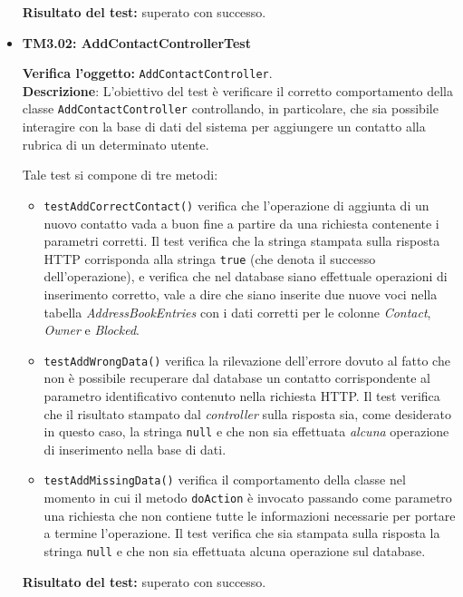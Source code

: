 \begin{itemize}
\begin{itemize}
\end{itemize}
\textbf{Risultato del test:} superato con successo.



\item[\passed] \textbf{TM3.02: AddContactControllerTest}

\textbf{Verifica l'oggetto:} \texttt{AddContactController}.\\
\textbf{Descrizione}: L'obiettivo del test è verificare il corretto comportamento della classe \texttt{AddContactController} controllando, in particolare, che sia possibile interagire con la base di dati del sistema per aggiungere un contatto alla rubrica di un determinato utente.

Tale test si compone di tre metodi:
\begin{itemize}
\item \texttt{testAddCorrectContact()} verifica che l'operazione di aggiunta di un nuovo contatto vada a buon fine a partire da una richiesta contenente i parametri corretti. Il test verifica che la stringa stampata sulla risposta HTTP corrisponda alla stringa \texttt{true} (che denota il successo dell'operazione), e verifica che nel database siano effettuale operazioni di inserimento corretto, vale a dire che siano inserite due nuove voci nella tabella \textit{AddressBookEntries} con i dati corretti per le colonne \textit{Contact}, \textit{Owner} e \textit{Blocked}.

\item \texttt{testAddWrongData()} verifica la rilevazione dell'errore dovuto al fatto che non è possibile recuperare dal database un contatto corrispondente al parametro identificativo contenuto nella richiesta HTTP. Il test verifica che il risultato stampato dal \textit{controller} sulla risposta sia, come desiderato in questo caso, la stringa \texttt{null} e che non sia effettuata \textit{alcuna} operazione di inserimento nella base di dati.

\item \texttt{testAddMissingData()} verifica il comportamento della classe nel momento in cui il metodo \texttt{doAction} è invocato passando come parametro una richiesta che non contiene tutte le informazioni necessarie per portare a termine l'operazione. Il test verifica che sia stampata sulla risposta la stringa \texttt{null} e che non sia effettuata alcuna operazione sul database.
\end{itemize}
\textbf{Risultato del test:} superato con successo.



\end{itemize}
